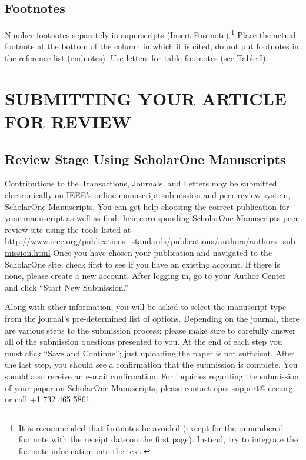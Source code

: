 \documentclass{IEEEtaes}
\begin{document}
\subsection{Footnotes}

Number footnotes separately in superscripts (Insert \textbar{}Footnote).\footnote{It is recommended that footnotes be avoided (except for the unnumbered footnote with the receipt date on the first page). Instead, try to integrate the footnote information into the text.} Place the actual footnote at the bottom of the column in which it is cited; do not put footnotes in the reference list (endnotes). Use letters for table footnotes (see Table I).

\section{SUBMITTING YOUR ARTICLE FOR REVIEW}

\subsection{Review Stage Using ScholarOne Manuscripts}

Contributions to the Transactions, Journals, and Letters may be submitted electronically on IEEE's online manuscript submission and peer-review system, ScholarOne Manuscripts. You can get help choosing the correct publication for your manuscript as well as find their corresponding ScholarOne Manuscripts peer review site using the tools listed at \href{http://www.ieee.org/publications\_standards/publications/authors/authors\_submission.html}{\url{http://www.ieee.org/publications\_standards/publications/authors/authors\_submission.html}} Once you have chosen your publication and navigated to the ScholarOne site, check first to see if you have an existing account. If there is none, please create a new account. After logging in, go to your Author Center and click ``Start New Submission.''

Along with other information, you will be asked to select the manuscript type from the journal's pre-determined list of options. Depending on the journal, there are various steps to the submission process; please make sure to carefully answer all of the submission questions presented to you. At the end of each step you must click ``Save and Continue''; just uploading the paper is not sufficient. After the last step, you should see a confirmation that the submission is complete. You should also receive an e-mail confirmation. For inquiries regarding the submission of your paper on ScholarOne Manuscripts, please contact \href{mailto:oprs-support@ieee.org}{oprs-support@ieee.org} or call +1 732 465 5861.
\end{document}
